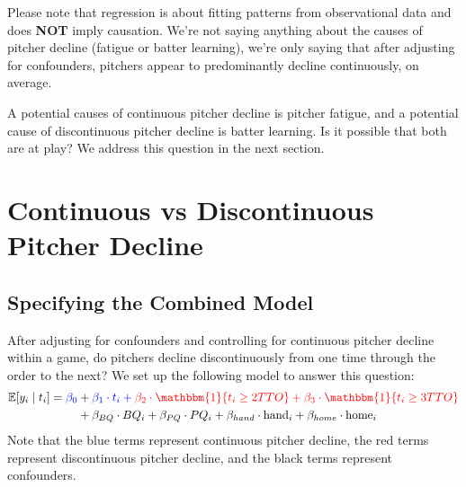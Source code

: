 \documentclass[twoside]{article}
\theoremstyle{definition}
\begin{document}
Please note that regression is about \color{blue} fitting patterns from observational data \color{black} and does \textbf{NOT} imply causation. We're not saying anything about the causes of pitcher decline (fatigue or batter learning), we're only saying that after adjusting for confounders, pitchers appear to predominantly decline continuously, on average.

A potential causes of continuous pitcher decline is pitcher fatigue, and a potential cause of discontinuous pitcher decline is batter learning. Is it possible that both are at play? We address this question in the next section.

\section{Continuous vs Discontinuous Pitcher Decline}

\subsection{Specifying the Combined Model}

After adjusting for confounders and controlling for continuous pitcher decline within a game, do pitchers decline discontinuously from one time through the order to the next? We set up the following model to answer this question:
\begin{align}
   \mathbb{E}[y_i \mid t_i] = \color{blue} \beta_0 &+ \color{blue} \beta_1 \cdot t_i + \color{red} \beta_2 \cdot \mathbbm{1}\{t_i \geq 2TTO\} + \beta_3 \cdot \mathbbm{1}\{t_i \geq 3TTO\} \\ \color{black}
   &+ \beta_{BQ} \cdot BQ_i + \beta_{PQ} \cdot PQ_i + \beta_{hand} \cdot \text{hand}_i + \beta_{home} \cdot \text{home}_i \nonumber
\end{align}
Note that the \color{blue} blue terms \color{black} represent continuous pitcher decline, the \color{red} red terms \color{black} represent discontinuous pitcher decline, and the \color{black} black terms \color{black} represent confounders.
\end{document}
